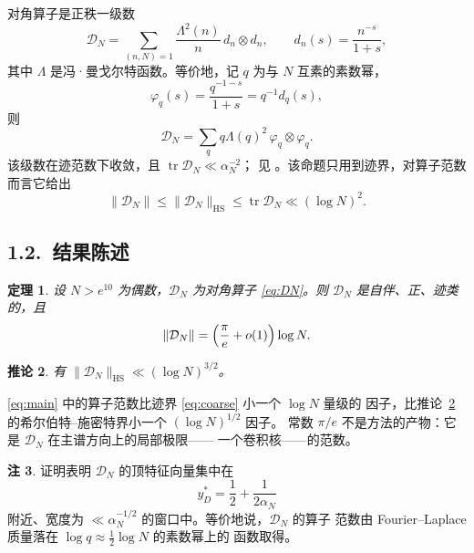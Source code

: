 \documentclass[12pt,a4paper]{amsart}
\numberwithin{equation}{section}
\theoremstyle{plain}
\newtheorem{theorem}{定理}[section]
\newtheorem{corollary}[theorem]{推论}
\theoremstyle{definition}
\newtheorem{remark}[theorem]{注}
\newcommand{\HS}{\mathrm{HS}}
\begin{document}
对角算子是正秩一级数
\begin{equation}\label{eq:DN}
 \mathcal D_N=\sum_{(n,N)=1}\frac{\Lambda^2(n)}{n}\,d_n\otimes d_n,
 \qquad d_n(s)=\frac{n^{-s}}{1+s},
\end{equation}
其中 $\Lambda$ 是冯·曼戈尔特函数。等价地，记 $q$ 为与 $N$ 互素的素数幂，
\begin{equation}\label{eq:phiq}
 \varphi_q(s)=\frac{q^{-1-s}}{1+s}=q^{-1}d_q(s),
\end{equation}
则
\begin{equation}\label{eq:DN2}
 \mathcal D_N=\sum_{q}q\Lambda(q)^2\,\varphi_q\otimes\varphi_q .
\end{equation}
该级数在迹范数下收敛，且 $\operatorname{tr}\mathcal D_N\ll\alpha_N^{-2}$；
见 \cite[命题 6.5]{LL}。该命题只用到迹界，对算子范数而言它给出
\begin{equation}\label{eq:coarse}
 \|\mathcal D_N\|\le\|\mathcal D_N\|_{\HS}\le\operatorname{tr}\mathcal D_N
 \ll(\log N)^2 .
\end{equation}

\subsection*{1.2.\ 结果陈述}

\begin{theorem}\label{thm:main}
设 $N>e^{10}$ 为偶数，$\mathcal D_N$ 为对角算子 \eqref{eq:DN}。则
$\mathcal D_N$ 是自伴、正、迹类的，且
\begin{equation}\label{eq:main}
 \|\mathcal D_N\|=\Bigl(\frac{\pi}{e}+o(1)\Bigr)\log N .
\end{equation}
\end{theorem}

\begin{corollary}\label{cor:HS}
有 $\|\mathcal D_N\|_{\HS}\ll(\log N)^{3/2}$。
\end{corollary}

\eqref{eq:main} 中的算子范数比迹界 \eqref{eq:coarse} 小一个 $\log N$ 量级的
因子，比推论~\ref{cor:HS} 的希尔伯特--施密特界小一个 $(\log N)^{1/2}$ 因子。
常数 $\pi/e$ 不是方法的产物：它是 $\mathcal D_N$ 在主谱方向上的局部极限——
一个卷积核——的范数。

\begin{remark}\label{rem:eigenvector}
证明表明 $\mathcal D_N$ 的顶特征向量集中在
\begin{equation}\label{eq:peakpoint}
 y_D^*=\frac12+\frac1{2\alpha_N}
\end{equation}
附近、宽度为 $\ll\alpha_N^{-1/2}$ 的窗口中。等价地说，$\mathcal D_N$ 的算子
范数由 Fourier--Laplace 质量落在 $\log q\approx\frac12\log N$ 的素数幂上的
函数取得。
\end{remark}
\end{document}
